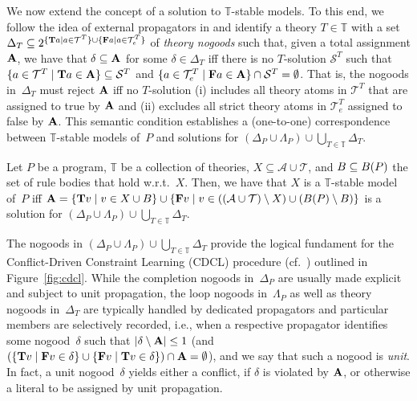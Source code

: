 We now extend the concept of a solution to $\mathbb{T}$-stable models.
To this end,
we follow the idea of external propagators in \cite{drewal12a}
and identify a theory $T\in\mathbb{T}$ with a set
$\Delta_T\subseteq 2^{\{\mathbf{T} a\mid a\in\mathcal{T}^T\}\cup\{\mathbf{F} a\mid a\in\mathcal{T}^T_e\}}$
of \emph{theory nogoods} such that,
given a total assignment $\mathbf{A}$,
we have that $\delta\subseteq\mathbf{A}$ for some $\delta\in\Delta_T$
iff
there is no $T$-solution $\mathcal{S}^T$ such that
$\{a\in\mathcal{T}^T\mid\Tlit{a}\in\nolinebreak\Ass\}\subseteq\mathcal{S}^T$
and
$\{a\in\mathcal{T}^T_e\mid\Flit{a}\in\nolinebreak\Ass\}\cap\mathcal{S}^T=\emptyset$.
%
That is, the nogoods in~$\Delta_T$ must reject $\mathbf{A}$ iff no $T$-solution
(i)
includes all theory atoms in $\mathcal{T}^T$ that are assigned to true by $\mathbf{A}$
and
(ii)
excludes all strict theory atoms in $\mathcal{T}^T_e$ assigned to false by $\mathbf{A}$.
This semantic condition establishes a (one-to-one) correspondence between
$\mathbb{T}$-stable models of~$P$ and solutions for $(\Delta_P\cup\Lambda_P)\cup\bigcup_{T\in\mathbb{T}}\Delta_T$.
%
\begin{proposition}\label{prop:sound}
Let $P$ be a %
program, %
$\mathbb{T}$ be
a collection of theories,
$X\subseteq\mathcal{A}\cup\mathcal{T}$, and
$B\subseteq B(P)$ %
the set of rule bodies that hold w.r.t.~$X$.
Then, we have that $X$ is a $\mathbb{T}$-stable model of~$P$ iff
$\mathbf{A}=\{\mathbf{T} v\mid v\in X\cup B\}\cup\{\mathbf{F} v\mid v\in ((\mathcal{A}\cup\mathcal{T})\setminus X)\cup(B(P)\setminus B)\}$
is a solution for
$(\Delta_P\cup\Lambda_P)\cup\bigcup_{T\in\mathbb{T}}\Delta_T$.
\end{proposition}
%

The nogoods in $(\Delta_P\cup\Lambda_P)\cup\bigcup_{T\in\mathbb{T}}\Delta_T$ provide the
logical fundament for the Conflict-Driven Constraint Learning (CDCL) procedure
(cf.\ \cite{malyma09a,gekasc09c})
outlined in Figure~\ref{fig:cdcl}.
While the completion nogoods in~$\Delta_P$ are usually made explicit and subject to
unit propagation,
the loop nogoods in~$\Lambda_P$ as well as theory nogoods in~$\Delta_T$ are typically
handled by dedicated propagators and particular members are selectively recorded, i.e.,
when a respective propagator identifies some nogood~$\delta$ such that
$|\delta\setminus\mathbf{A}|\leq 1$
(and $(\{\Tlit{v}\mid\Flit{v}\in\nolinebreak\delta\}\cup\linebreak[1]\{\Flit{v}\mid\Tlit{v}\in\delta\})\cap\Ass=\emptyset$), and we say that such a nogood is \emph{unit}.
In fact, a unit nogood~$\delta$ yields either a conflict, if $\delta$ is violated by $\mathbf{A}$,
or otherwise a literal to be assigned by unit propagation.

